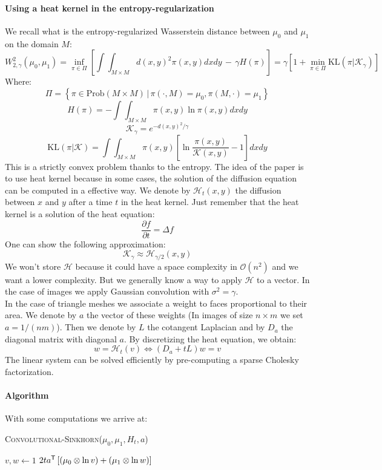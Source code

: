 \paragraph{Using a heat kernel in the entropy-regularization}
We recall what is the entropy-regularized Wasserstein distance between $\mu_0$ and $\mu_1$ on the domain $M$:
$$ W_{2, \gamma}^2(\mu_0, \mu_1) = \inf_{\pi \in \Pi} \left[ \int \int_{M \times M} d(x, y)^2 \pi(x, y) dx dy \, - \, \gamma H(\pi) \right] = \gamma \left[ 1 + \min_{\pi \in \Pi} \text{KL}(\pi | \mathcal{K}_\gamma) \right]$$
Where:
$$ \Pi = \left\{ \pi \in \text{Prob}(M \times M) \, | \, \pi(\cdot, M) = \mu_0, \pi(M, \cdot) = \mu_1 \right\} $$
$$ H(\pi) = - \int \int_{M \times M} \pi(x, y) \ln \pi(x, y) dx dy $$
$$ \mathcal{K}_\gamma = e^{-d(x, y)^2 / \gamma} $$
$$ \text{KL}(\pi | \mathcal{K}) = \int \int_{M \times M} \pi(x, y) \left[ \ln \dfrac{\pi(x, y)}{\mathcal{K}(x, y)} - 1 \right] dx dy $$
This is a strictly convex problem thanks to the entropy. The idea of the paper is to use heat kernel because in some cases, the solution of the diffusion equation can be computed in a effective way. We denote by $\mathcal{H}_t(x, y)$ the diffusion between $x$ and $y$ after a time $t$ in the heat kernel. Just remember that the heat kernel is a solution of the heat equation:
$$ \dfrac{\partial f}{\partial t} = \Delta f $$
One can show the following approximation:
$$ \mathcal{K}_\gamma \approx \mathcal{H}_{\gamma / 2}(x, y) $$
We won't store $\mathcal{H}$ because it could have a space complexity in $\mathcal{O}(n^2)$ and we want a lower complexity. But we generally know a way to apply $\mathcal{H}$ to a vector. In the case of images we apply Gaussian convolution with $\sigma^2 = \gamma$. \\
In the case of triangle meshes we associate a weight to faces proportional to their area. We denote by $a$ the vector of these weights (In images of size $n \times m$ we set $a = 1 / (nm)$). Then we denote by $L$ the cotangent Laplacian and by $D_a$ the diagonal matrix with diagonal $a$. By discretizing the heat equation, we obtain:
$$ w = \mathcal{H}_t(v) \Leftrightarrow \left( D_a + t L \right) w = v $$
The linear system can be solved efficiently by pre-computing a sparse Cholesky factorization.

\paragraph{Algorithm}
With some computations we arrive at:

\vspace{3mm}
\begin{algorithm}[H]
	\caption{\textsc{Convolutional-Sinkhorn}($\mu_0, \mu_1, H_t, a$)}
	$v, w \gets 1$ \;
	\Return $2t a^{\mathsf{T}} \left[ \left( \mu_0 \otimes \ln v \right) + \left( \mu_1 \otimes \ln w \right) \right]$
\end{algorithm}
\vspace{3mm}


